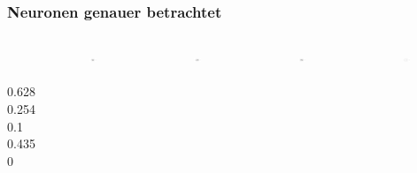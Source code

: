 \documentclass{beamer}
\begin{document}
\begin{frame}
	\frametitle{Neuronen genauer betrachtet}
	\begin{columns}
		\\
		\vspace{6.5em}
		 \\
		\vspace{4em}
		0.628 \\ 0.254 \\
		\vspace{3em}
		0.1 \\ 0.435 \\ 0
		\begin{figure}
			\includegraphics[width=0.5\textwidth]{img/neuron0.png} 
		\end{figure}
		\begin{figure}
			\includegraphics[width=0.5\textwidth]{img/neuron1.png} 
		\end{figure}
		\begin{figure}
			\includegraphics[width=0.5\textwidth]{img/neuron2.png} 
		\end{figure}
		\begin{figure}
			\includegraphics[width=0.5\textwidth]{img/neuron3.png} 

\end{figure}
\end{columns}
\end{frame}
\end{document}

